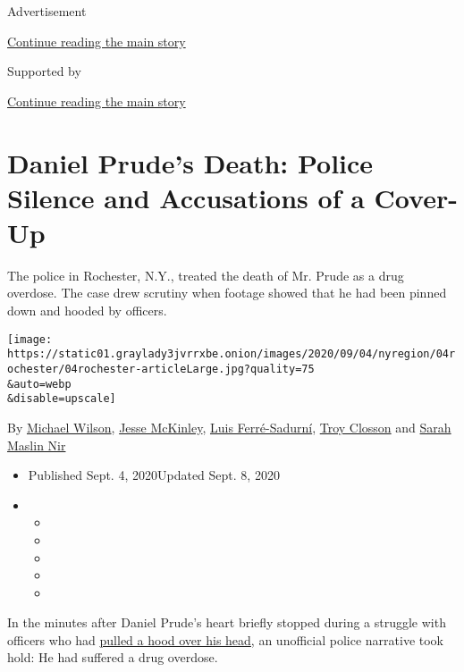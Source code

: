 Advertisement

\protect\hyperlink{after-top}{Continue reading the main story}

Supported by

\protect\hyperlink{after-sponsor}{Continue reading the main story}

\hypertarget{daniel-prudes-death-police-silence-and-accusations-of-a-cover-up}{%
\section{Daniel Prude's Death: Police Silence and Accusations of a
Cover-Up}\label{daniel-prudes-death-police-silence-and-accusations-of-a-cover-up}}

The police in Rochester, N.Y., treated the death of Mr. Prude as a drug
overdose. The case drew scrutiny when footage showed that he had been
pinned down and hooded by officers.

\texttt{[image: https://static01.graylady3jvrrxbe.onion/images/2020/09/04/nyregion/04rochester/04rochester-articleLarge.jpg?quality=75\\\&auto=webp\\\&disable=upscale]}

By \href{https://www.nytimes3xbfgragh.onion/by/michael-wilson}{Michael
Wilson},
\href{https://www.nytimes3xbfgragh.onion/by/jesse-mckinley}{Jesse
McKinley},
\href{https://www.nytimes3xbfgragh.onion/by/luis-ferre-sadurni}{Luis
Ferré-Sadurní},
\href{https://www.nytimes3xbfgragh.onion/by/troy-closson}{Troy Closson}
and \href{https://www.nytimes3xbfgragh.onion/by/sarah-maslin-nir}{Sarah
Maslin Nir}

\begin{itemize}
\item
  Published Sept. 4, 2020Updated Sept. 8, 2020
\item
  \begin{itemize}
  \item
  \item
  \item
  \item
  \item
  \end{itemize}
\end{itemize}

In the minutes after Daniel Prude's heart briefly stopped during a
struggle with officers who had
\href{https://www.nytimes3xbfgragh.onion/2020/09/03/nyregion/daniel-prude-police-rochester.html}{pulled
a hood over his head}, an unofficial police narrative took hold: He had
suffered a drug overdose.

